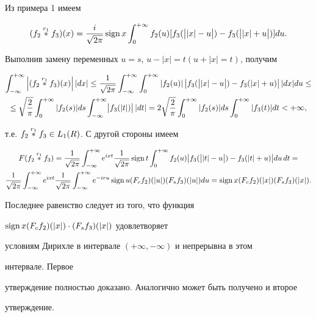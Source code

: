 \begin{pf}


Из примера 1 имеем


$$


(f_2\up{r_1}{}f_3)(x)=\frac{i}{\sqrt{2\pi}}\sign x


\int^{+\infty}_0 f_2(u)[f_3(\bigl|\bigr.|x|-u\bigl.\bigr|)-


f_3(\bigl|\bigr.|x|+u\bigl.\bigr|)]du.


$$


Выполнив замену переменных $u=s$, $u-|x|=t(u+|x|=t)$, получим


\begin{multline*}


\int^{+\infty}_{-\infty}


\left|(f_2\up{r_1}{}f_3)(x)\right||dx|\le\frac{1}{\sqrt{2\pi}}


\int^{+\infty}_{-\infty}\int^{+\infty}_0


|f_2(u)|\, \bigl|\bigr. f_3(\bigl|\bigr.|x|-u\bigl.\bigr|)


-f_3(|x|+u)\bigl.\bigr|\,|dx|du\le\\


\le \sqrt{\frac{2}{\pi}}\int^{+\infty}_0|f_2(s)|ds


\int^{+\infty}_{-\infty}\bigl|\bigr.f_3(|t|)\bigl.\bigr|\,|dt|


=2\sqrt{\frac{2}{\pi}}\int^{+\infty}_0|f_2(s)|ds


\int^{+\infty}_0|f_3(t)|dt<+\infty,


\end{multline*}


т.е. $f_2\overset{r_1}{\ast}{}f_3\in L_1(R)$. С другой стороны имеем


\begin{multline*}


F(f_2\up{r_1}{}f_3)=\frac{1}{\sqrt{2\pi}}\int^{+\infty}_{-\infty}


e^{ixt}\frac{1}{\sqrt{2\pi}}\sign t \int^{+\infty}_0


f_2(u)\bigl|\bigr.f_3(\bigl|\bigr.|t|-u\bigl.\bigr|)-


f_3(|t|+u)\bigl.\bigr|du\,dt=\\


\frac{1}{\sqrt{2\pi}}\int^{+\infty}_{-\infty}e^{ixt}


\frac{1}{\sqrt{2\pi}}\int^{+\infty}_{-\infty}e^{-iru}


\sign u(F_cf_2)(|u|)(F_sf_3)(|u|)du=


\sign x(F_cf_2)(|x|)(F_sf_3)(|x|).


\end{multline*}


Последнее равенство следует из того, что функция


$\operatorname{sign} x(F_cf_2)(|x|)\cdot(F_sf_3)(|x|)$ удовлетворяет


условиям Дирихле в интервале $(+\infty,-\infty)$ и непрерывна в этом


интервале. Первое


утверждение полностью доказано. Аналогично может быть получено и второе


утверждение.


\end{pf}
